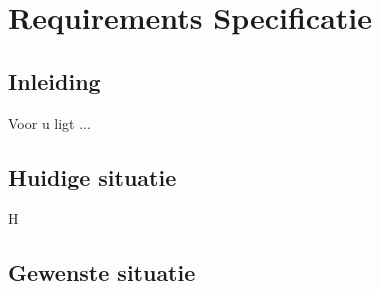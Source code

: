 
\chapter{Requirements Specificatie}\label{ch:requirements-specificatie}

\section{Inleiding}\label{sec:RS_inleiding}
Voor u ligt ...
\lipsum[01]

\lipsum[02]

\section{Huidige situatie}
H

\section{Gewenste situatie}
